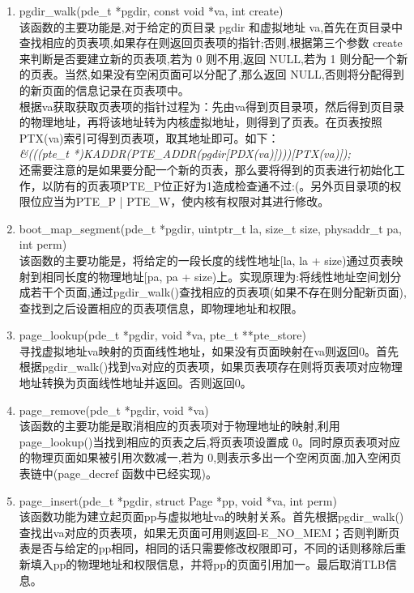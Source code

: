 \documentclass[11pt,a4paper]{article}
\begin{document}
\begin{enumerate}
\item pgdir\_walk(pde\_t *pgdir, const void *va, int create)\\
该函数的主要功能是,对于给定的页目录 pgdir 和虚拟地址 va,首先在页目录中查找相应的页表项,如果存在则返回页表项的指针;否则,根据第三个参数 create 来判断是否要建立新的页表项,若为 0 则不用,返回 NULL,若为 1 则分配一个新的页表。当然,如果没有空闲页面可以分配了,那么返回 NULL,否则将分配得到的新页面的信息记录在页表项中。\\
根据va获取获取页表项的指针过程为：先由va得到页目录项，然后得到页目录的物理地址，再将该地址转为内核虚拟地址，则得到了页表。在页表按照PTX(va)索引可得到页表项，取其地址即可。如下：\\
\textit{\&(((pte\_t *)KADDR(PTE\_ADDR(pgdir[PDX(va)])))[PTX(va)]);}\\
还需要注意的是如果要分配一个新的页表，那么要将得到的页表进行初始化工作，以防有的页表项PTE\_P位正好为1造成检查通不过:(。另外页目录项的权限位应当为PTE\_P | PTE\_W，使内核有权限对其进行修改。
\item boot\_map\_segment(pde\_t *pgdir, uintptr\_t la, size\_t size, physaddr\_t pa, int perm)\\
该函数的主要功能是，将给定的一段长度的线性地址[la, la + size)通过页表映射到相同长度的物理地址[pa, pa + size)上。实现原理为:将线性地址空间划分成若干个页面,通过pgdir\_walk()查找相应的页表项(如果不存在则分配新页面),查找到之后设置相应的页表项信息，即物理地址和权限。\\
\item page\_lookup(pde\_t *pgdir, void *va, pte\_t **pte\_store)\\
寻找虚拟地址va映射的页面线性地址，如果没有页面映射在va则返回0。首先根据pgdir\_walk()找到va对应的页表项，如果页表项存在则将页表项对应物理地址转换为页面线性地址并返回。否则返回0。
\item page\_remove(pde\_t *pgdir, void *va)\\
该函数的主要功能是取消相应的页表项对于物理地址的映射,利用page\_lookup()当找到相应的页表之后,将页表项设置成 0。同时原页表项对应的物理页面如果被引用次数减一,若为 0,则表示多出一个空闲页面,加入空闲页表链中(page\_decref 函数中已经实现)。
\item page\_insert(pde\_t *pgdir, struct Page *pp, void *va, int perm)\\
该函数功能为建立起页面pp与虚拟地址va的映射关系。首先根据pgdir\_walk()查找出va对应的页表项，如果无页面可用则返回-E\_NO\_MEM；否则判断页表是否与给定的pp相同，相同的话只需要修改权限即可，不同的话则移除后重新填入pp的物理地址和权限信息，并将pp的页面引用加一。最后取消TLB信息。\\
\end{enumerate}
\end{document}
